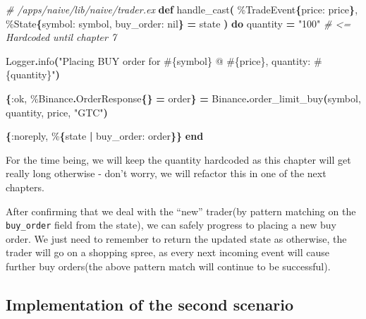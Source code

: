 \documentclass[
  oneside]{book}
\newenvironment{Shaded}{\begin{snugshade}}{\end{snugshade}}
\newcommand{\CommentTok}[1]{\textcolor[rgb]{0.56,0.35,0.01}{\textit{#1}}}
\newcommand{\ConstantTok}[1]{\textcolor[rgb]{0.56,0.35,0.01}{#1}}
\newcommand{\FunctionTok}[1]{\textcolor[rgb]{0.13,0.29,0.53}{\textbf{#1}}}
\newcommand{\KeywordTok}[1]{\textcolor[rgb]{0.13,0.29,0.53}{\textbf{#1}}}
\newcommand{\NormalTok}[1]{#1}
\newcommand{\OperatorTok}[1]{\textcolor[rgb]{0.81,0.36,0.00}{\textbf{#1}}}
\newcommand{\OtherTok}[1]{\textcolor[rgb]{0.56,0.35,0.01}{#1}}
\newcommand{\StringTok}[1]{\textcolor[rgb]{0.31,0.60,0.02}{#1}}
\newcommand{\VariableTok}[1]{\textcolor[rgb]{0.00,0.00,0.00}{#1}}
\begin{document}
\begin{Shaded}
\begin{Highlighting}[]
  \CommentTok{\# /apps/naive/lib/naive/trader.ex}
  \KeywordTok{def}\NormalTok{ handle\_cast}\FunctionTok{(}
\NormalTok{        \%}\ConstantTok{TradeEvent}\FunctionTok{\{}\VariableTok{price:}\NormalTok{ price}\FunctionTok{\}}\NormalTok{,}
\NormalTok{        \%}\ConstantTok{State}\FunctionTok{\{}\VariableTok{symbol:}\NormalTok{ symbol, }\VariableTok{buy\_order:} \ConstantTok{nil}\FunctionTok{\}} \OperatorTok{=}\NormalTok{ state}
      \FunctionTok{)} \KeywordTok{do}
\NormalTok{    quantity }\OperatorTok{=} \StringTok{"100"} \CommentTok{\# \textless{}= Hardcoded until chapter 7}

    \ConstantTok{Logger}\OperatorTok{.}\NormalTok{info}\FunctionTok{(}\StringTok{"Placing BUY order for }\OtherTok{\#\{}\NormalTok{symbol}\OtherTok{\}}\StringTok{ @ }\OtherTok{\#\{}\NormalTok{price}\OtherTok{\}}\StringTok{, quantity: }\OtherTok{\#\{}\NormalTok{quantity}\OtherTok{\}}\StringTok{"}\FunctionTok{)}

    \FunctionTok{\{}\VariableTok{:ok}\NormalTok{, \%}\ConstantTok{Binance}\OperatorTok{.}\ConstantTok{OrderResponse}\FunctionTok{\{\}} \OperatorTok{=}\NormalTok{ order}\FunctionTok{\}} \OperatorTok{=}
      \ConstantTok{Binance}\OperatorTok{.}\NormalTok{order\_limit\_buy}\FunctionTok{(}\NormalTok{symbol, quantity, price, }\StringTok{"GTC"}\FunctionTok{)}

    \FunctionTok{\{}\VariableTok{:noreply}\NormalTok{, \%}\FunctionTok{\{}\NormalTok{state }\OperatorTok{|} \VariableTok{buy\_order:}\NormalTok{ order}\FunctionTok{\}\}}
  \KeywordTok{end}
\end{Highlighting}
\end{Shaded}

For the time being, we will keep the quantity hardcoded as this chapter will
get really long otherwise - don't worry, we will refactor this in one of the next chapters.

After confirming that we deal with the ``new'' trader(by pattern matching on the \texttt{buy\_order} field from the state), we can safely progress to placing a new buy order. We just need to remember to return the updated state as otherwise, the trader will go on a shopping spree, as every next incoming event will cause further buy orders(the above pattern match will continue to be successful).

\subsection{Implementation of the second scenario}\label{implementation-of-the-second-scenario}
\end{document}
